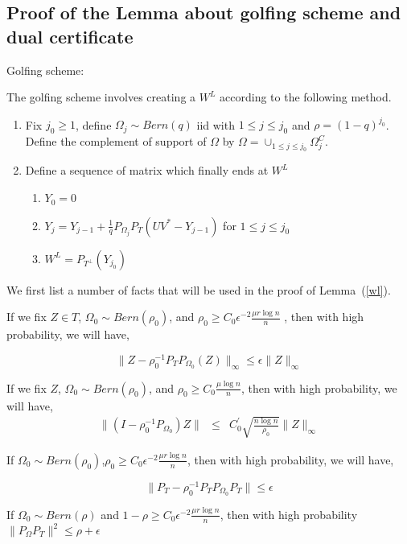 \newpage
\subsection{Proof of the Lemma about golfing scheme and dual certificate }
Golfing scheme:

The golfing scheme involves creating a $W^{L}$ according to the following method.
\begin{enumerate}
\item Fix $j_{0}\ge1$, define $\Omega_{j}\sim Bern(q)$ iid with $1\le j\le j_{0}$ and $\rho=(1-q)^{j_{0}}$. Define the complement of support of $\Omega$ by $\Omega=\cup_{1\le j\le j_{0}}\Omega_{j}^{C}$.
\item Define a sequence of matrix which finally ends at $W^{L}$

\begin{enumerate}
\item $Y_{0}=0$
\item $Y_{j}=Y_{j-1}+\frac{1}{q}P_{\Omega_{j}}P_{T}(UV^{*}-Y_{j-1})$ for $1\le j\le j_{0}$
\item $W^{L}=P_{\ensuremath{T^{\bot}}}(Y_{j_{0}})$
\end{enumerate}

\end{enumerate}

We first list a number of facts that will be used in the proof of Lemma~(\ref{wl}).

\begin{fact}
\label{fact2}
If we fix $Z\in T$, $\Omega_{0}\sim Bern(\rho_{0})$, and $\rho_{0}\ge C_{0}\epsilon^{-2}\frac{\mu r\log n}{n}$ , then with high probability, we will have,

\label{fact5}
\[
\|Z-\rho_{0}^{-1}P_{T}P_{\Omega_{0}}(Z)\|_{\infty}\le\epsilon\|Z\|_{\infty}
\]

\begin{fact}
\label{fact3}
If we fix $Z$, $\Omega_{0}\sim Bern(\rho_{0})$, and $\rho_{0}\ge C_{0}\frac{\mu\log n}{n}$, then with high probability,
we will have,
\begin{eqnarray*}
\|(I-\rho_{0}^{-1}P_{\Omega_{0}})Z\| & \le & C_{0}^{'}\sqrt{\frac{n\log n}{\rho_{0}}}\|Z\|_{\infty}
\end{eqnarray*}

\begin{fact}
\label{fact4}
If $\Omega_{0}\sim Bern(\rho_{0})$,$\rho_{0}\ge C_{0}\epsilon^{-2}\frac{\mu r\log n}{n}$, then with high probability, we will have,

\[
\|P_{T}-\rho_{0}^{-1}P_{T}P_{\Omega_{0}}P_{T}\|\le\epsilon
\]

\begin{fact}
If $\Omega_{0}\sim Bern(\rho)$ and $1-\rho\ge C_{0}\epsilon^{-2}\frac{\mu r\log n}{n}$, then with high probability $\|P_{\Omega}P_{T}\|^{2}\le\rho+\epsilon$
\end{fact}
\end{fact}
\end{fact}
\end{fact}


